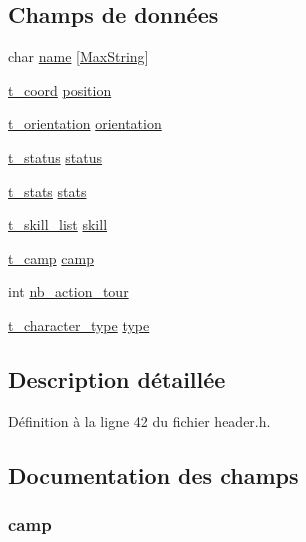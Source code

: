 \subsection*{Champs de données}
\begin{DoxyCompactItemize}
\item 
char \hyperlink{structt__character_ab27f28c5ead39031421706ddbbd1edea}{name} \mbox{[}\hyperlink{header_8h_ab154998a3a376095f3601bc35c5cf523}{Max\-String}\mbox{]}
\item 
\hyperlink{structt__coord}{t\-\_\-coord} \hyperlink{structt__character_a27c93348dcaa3ea78282fb5ef6ce371b}{position}
\item 
\hyperlink{header_8h_a6dc6eccccaf78ef029cff998c0e654f4}{t\-\_\-orientation} \hyperlink{structt__character_af778044107ad1a59b9725fa3962560ad}{orientation}
\item 
\hyperlink{structt__status}{t\-\_\-status} \hyperlink{structt__character_a3ade6b90793e915ca28b52fb70e58e3f}{status}
\item 
\hyperlink{structt__stats}{t\-\_\-stats} \hyperlink{structt__character_a29711825af64d428d19df366a5056670}{stats}
\item 
\hyperlink{structt__skill__list}{t\-\_\-skill\-\_\-list} \hyperlink{structt__character_ae7aa14804e69b1bc9652c16261da0c9f}{skill}
\item 
\hyperlink{header_8h_a4bb25c9352f7bb2ea2eb663ccf579528}{t\-\_\-camp} \hyperlink{structt__character_a48707185be865bad67e5c61e5903ae5a}{camp}
\item 
int \hyperlink{structt__character_aaff424b51f4bd3db2c199cc08f21f86d}{nb\-\_\-action\-\_\-tour}
\item 
\hyperlink{header_8h_ac8020d257c824e4b188c04ee386ebfda}{t\-\_\-character\-\_\-type} \hyperlink{structt__character_a3b5fecb9824668aab778f82005089942}{type}
\end{DoxyCompactItemize}


\subsection{Description détaillée}


Définition à la ligne 42 du fichier header.\-h.



\subsection{Documentation des champs}
\hypertarget{structt__character_a48707185be865bad67e5c61e5903ae5a}{
\subsubsection[{camp}]{ camp}}\label{structt__character_a48707185be865bad67e5c61e5903ae5a}


